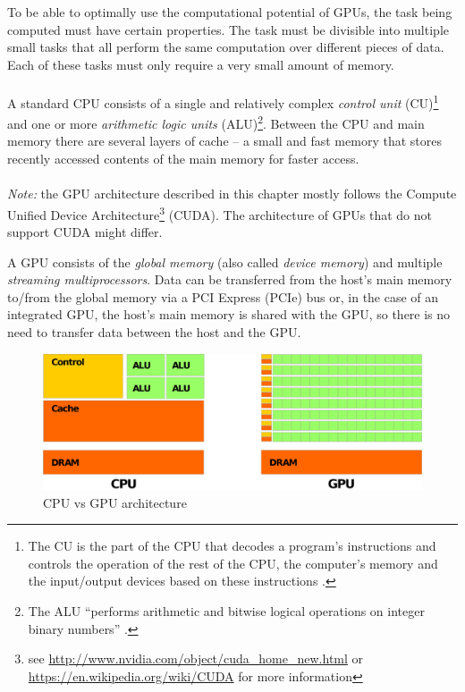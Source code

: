\documentclass[12pt,oneside]{fithesis2}
\begin{document}
      To be able to optimally use the computational potential of GPUs, the task being computed must have certain properties. The task must be divisible into multiple small tasks that all perform the same computation over different pieces of data. Each of these tasks must only require a very small amount of memory.
      
      \paragraph*{}
      A standard CPU consists of a single and relatively complex \emph{control unit} (CU)\footnote{The CU is the part of the CPU that decodes a program's instructions and controls the operation of the rest of the CPU, the computer's memory and the input/output devices based on these instructions \cite{wiki:CU}.} and one or more \emph{arithmetic logic units} (ALU)\footnote{The ALU ``performs arithmetic and bitwise logical operations on integer binary numbers'' \cite{wiki:ALU}.}. Between the CPU and main memory there are several layers of cache -- a small and fast memory that stores recently accessed contents of the main memory for faster access.
      
      \paragraph*{}
      \emph{Note:} the GPU architecture described in this chapter mostly follows the Compute Unified Device Architecture\footnote{see \url{http://www.nvidia.com/object/cuda_home_new.html} or \url{https://en.wikipedia.org/wiki/CUDA} for more information} (CUDA). The architecture of GPUs that do not support CUDA might differ.
      
      A GPU consists of the \emph{global memory} (also called \emph{device memory}) and multiple \emph{streaming multiprocessors}. Data can be transferred from the host's main memory to/from the global memory via a PCI Express (PCIe) bus or, in the case of an integrated GPU, the host's main memory is shared with the GPU, so there is no need to transfer data between the host and the GPU.
      
      \begin{figure}
        \centering
        \includegraphics[width=\linewidth]{images/gpu-vs-cpu.eps}
        \caption{CPU vs GPU architecture\protect\footnotemark}
      \end{figure}
      
\end{document}
